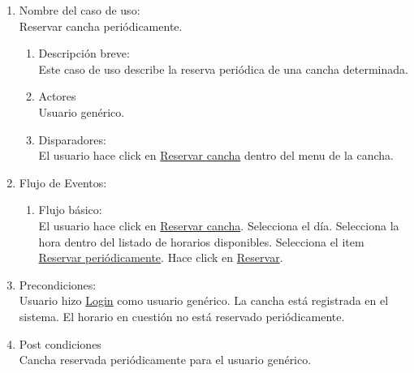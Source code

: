 \documentclass[a4paper,11pt]{article}
\begin{document}
\begin{enumerate}

    \item Nombre del caso de uso: \\
    Reservar cancha periódicamente.

    \begin{enumerate}
    \item Descripción breve: \\
        Este caso de uso describe la reserva periódica de una cancha determinada.
    \item Actores \\
        Usuario genérico.
    \item Disparadores: \\
        El usuario hace click en \underline{Reservar cancha}
        dentro del menu de la cancha.
    \end{enumerate}

    \item Flujo de Eventos: \\

    \begin{enumerate}

        \item Flujo básico:\\
            El usuario hace click en \underline{Reservar cancha}.
            Selecciona el día.
            Selecciona la hora dentro del listado de horarios disponibles.
            Selecciona el item \underline{Reservar periódicamente}.
            Hace click en \underline{Reservar}.
    \end{enumerate}

    \item Precondiciones: \\
        Usuario hizo \underline{Login} como usuario genérico.
        La cancha está registrada en el sistema.
        El horario en cuestión no está reservado periódicamente.

    \item Post condiciones \\
        Cancha reservada periódicamente para el usuario genérico.

\end{enumerate}


\end{document}
